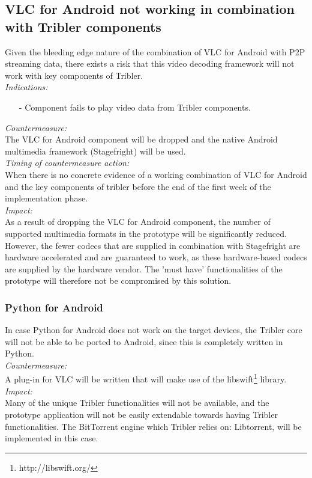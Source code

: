 \subsection{VLC for Android not working in combination with Tribler components}
Given the bleeding edge nature of the combination of VLC for Android with P2P streaming data, there exists a risk that this video decoding framework will not work with key components of Tribler.\\
\newline
\textit{Indications:}
\begin{itemize}
	\item[-]Component fails to play video data from Tribler components.
\end{itemize}
\textit{Countermeasure:}\\
The VLC for Android component will be dropped and the native Android multimedia framework (Stagefright) will be used.\\
\newline
\textit{Timing of countermeasure action:}\\
When there is no concrete evidence of a working combination of VLC for Android and the key components of tribler before the end of the first week of the implementation phase.\\
\newline
\textit{Impact:}\\
As a result of dropping the VLC for Android component, the number of supported multimedia formats in the prototype will be significantly reduced. However, the fewer codecs that are supplied in combination with Stagefright are hardware accelerated and are guaranteed to work, as these hardware-based codecs are supplied by the hardware vendor. The 'must have' functionalities of the prototype will therefore not be compromised by this solution.\\ 
\subsubsection{Python for Android}
In case Python for Android does not work on the target devices, the Tribler core will not be able to be ported to Android, since this is completely written in Python.\\
\newline
\textit{Countermeasure:}\\
A plug-in for VLC will be written that will make use of the libswift\footnote{http://libswift.org/} library.\\
\newline
\textit{Impact:}\\
Many of the unique Tribler functionalities will not be available, and the prototype application will not be easily extendable towards having Tribler functionalities. The BitTorrent engine which Tribler relies on: Libtorrent, will be implemented in this case.
